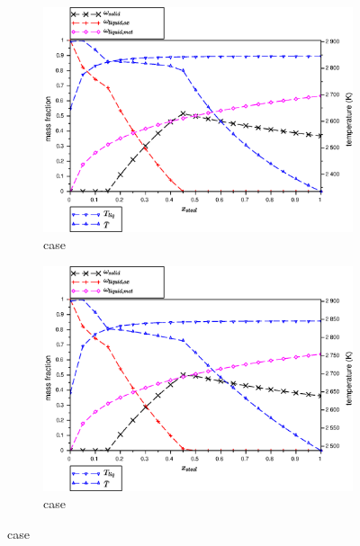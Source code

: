 \begin{figure}[htb!]
\\
\begin{subfigure}[t]{0.48\textwidth} 
 \centering \includegraphics[width=\textwidth]{figures/CalphadBasedEOSTest/OpenCalphad_NUCLEA9_scheilGulliver/C32_1850_x-T.eps} 
\caption{ case} \label{fig:x-T_C32_1850_OpenCalphad_NUCLEA9_scheilGulliver} 
\end{subfigure}
\hspace{0.01\textwidth}%
\begin{subfigure}[t]{0.48\textwidth} 
 \centering \includegraphics[width=\textwidth]{figures/CalphadBasedEOSTest/OpenCalphad_NUCLEA9_separatedLiquidEqs/C32_1850_x-T.eps} 
\caption{ case} \label{fig:x-T_C32_1850_OpenCalphad_NUCLEA9_separatedLiquidEqs} 

\end{subfigure}
\end{figure}
